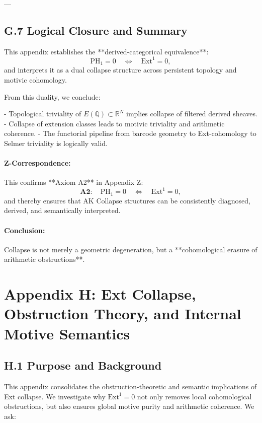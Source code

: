 ---

\subsection*{G.7 Logical Closure and Summary}

This appendix establishes the **derived-categorical equivalence**:
\[
\mathrm{PH}_1 = 0 \quad \Longleftrightarrow \quad \mathrm{Ext}^1 = 0,
\]
and interprets it as a dual collapse structure across persistent topology and motivic cohomology.

From this duality, we conclude:

- Topological triviality of \( E(\mathbb{Q}) \subset \mathbb{R}^N \) implies collapse of filtered derived sheaves.
- Collapse of extension classes leads to motivic triviality and arithmetic coherence.
- The functorial pipeline from barcode geometry to Ext-cohomology to Selmer triviality is logically valid.

\paragraph{Z-Correspondence:}  
This confirms **Axiom A2** in Appendix Z:
\[
\textbf{A2}: \quad \mathrm{PH}_1 = 0 \quad \Longleftrightarrow \quad \mathrm{Ext}^1 = 0,
\]
and thereby ensures that AK Collapse structures can be consistently diagnosed, derived, and semantically interpreted.

\paragraph{Conclusion:}  
Collapse is not merely a geometric degeneration, but a **cohomological erasure of arithmetic obstructions**.



\section*{Appendix H: Ext Collapse, Obstruction Theory, and Internal Motive Semantics}

\subsection*{H.1 Purpose and Background}

This appendix consolidates the obstruction-theoretic and semantic implications of Ext collapse.  
We investigate why \( \mathrm{Ext}^1 = 0 \) not only removes local cohomological obstructions, but also ensures global motive purity and arithmetic coherence.  
We ask:


